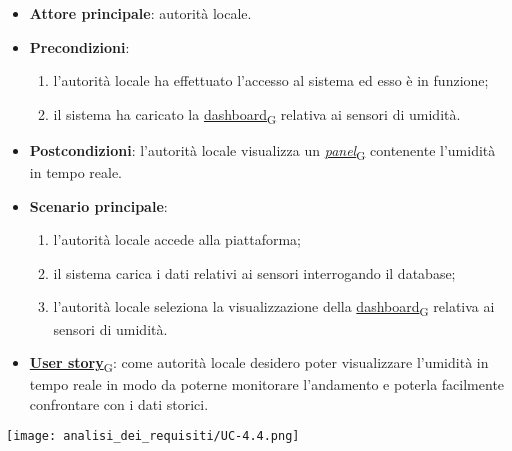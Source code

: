 \begin{itemize}
	\item \textbf{Attore principale}: autorità locale.
	\item \textbf{Precondizioni}:
	      \begin{enumerate}
		      \item l'autorità locale ha effettuato l'accesso al sistema ed esso è in funzione;
		      \item il sistema ha caricato la \href{https://7last.github.io/docs/rtb/documentazione-interna/glossario\#dashboard}{dashboard\textsubscript{G}} relativa ai sensori di umidità.
	      \end{enumerate}
	\item \textbf{Postcondizioni}: l'autorità locale visualizza un \href{https://7last.github.io/docs/rtb/documentazione-interna/glossario\#panel}{\textit{panel}\textsubscript{G}} contenente l'umidità in tempo reale.
	\item \textbf{Scenario principale}:
	      \begin{enumerate}
		      \item l'autorità locale accede alla piattaforma;
		      \item il sistema carica i dati relativi ai sensori interrogando il database;
		      \item l'autorità locale seleziona la visualizzazione della \href{https://7last.github.io/docs/rtb/documentazione-interna/glossario\#dashboard}{dashboard\textsubscript{G}} relativa ai sensori di umidità.
	      \end{enumerate}
	\item \href{https://7last.github.io/docs/rtb/documentazione-interna/glossario\#user-story}{\textbf{User story}\textsubscript{G}}:
	      come autorità locale desidero poter visualizzare l'umidità in tempo reale in modo da poterne monitorare l'andamento
	      e poterla facilmente confrontare con i dati storici.
\end{itemize}
\begin{center}
	\texttt{[image: analisi\_dei\_requisiti/UC-4.4.png]}
\end{center}

\newpage

